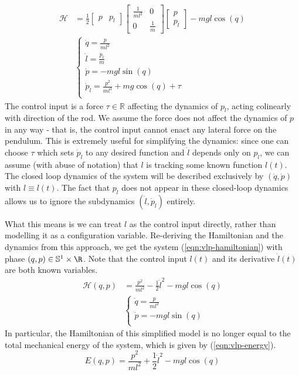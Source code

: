 \begin{align}\label{eqn:vlp-hamiltonian-with-pl}
   \mathcal{H} &= \frac{1}{2} \begin{bmatrix} p & p_l \end{bmatrix}
      \begin{bmatrix}
         \frac{1}{ml^2}  & 0 \\
         0 & \frac{1}{m}
      \end{bmatrix} \begin{bmatrix} p \\ p_l \end{bmatrix} - mgl\cos(q) \\
     &\begin{cases}
        \dot{q} = \frac{p}{ml^2} \\
        \dot{l} = \frac{p_l}{m} \\
        \dot{p} = -mgl\sin(q) \\
        \dot{p}_l = \frac{p^2}{ml^3} + mg\cos(q) + \tau \\
   \end{cases} \nonumber
\end{align}
The control input is a force \(\tau \in \mathbb{R}\) affecting the dynamics of
\(p_l\), acting colinearly with direction of the rod.
We assume the force does not affect the dynamics of \(p\) in any way -
that is, the control input cannot enact any lateral force on the pendulum.
This is extremely useful for simplifying the dynamics: since one can choose
\(\tau\) which sets \(\dot{p}_l\) to any desired function and \(\dot{l}\)
depends only on \(p_l\), we can assume (with abuse of notation) that \(l\) is
tracking some known function \(l(t)\). 
The closed loop dynamics of the system will be described exclusively by
\((\dot{q},\dot{p})\) with \(l \equiv l(t)\).
The fact that \(p_l\) does not appear in these closed-loop dynamics allows us to
ignore the subdynamics \((\dot{l},\dot{p}_l)\) entirely. 

What this means is we can treat \(l\) as the control input directly, rather than
modelling it as a configuration variable. Re-deriving the Hamiltonian and the
dynamics from this approach, we get the system 
(\ref{eqn:vlp-hamiltonian}) with phase \((q,p) \in \mathbb{S}^1 \times \R\). 
Note that the control input \(l(t)\) and its derivative \(\dot{l}(t)\) are both
known variables.
\begin{align}\label{eqn:vlp-hamiltonian}
   \mathcal{H}(q,p) &= \frac{p^2}{ml^2} - \frac{1}{2}\dot{l}^2 - mgl\cos(q) \\
     &\begin{cases}
        \dot{q} = \frac{p}{ml^2} \\
        \dot{p} = -mgl\sin(q) \\
      \end{cases}\nonumber
\end{align}
In particular, the Hamiltonian of this simplified model is no longer equal to
the total mechanical energy of the system, which is given by
(\ref{eqn:vlp-energy}).
\begin{equation}\label{eqn:vlp-energy}
   E(q,p) = \frac{p^2}{ml^2} + \frac{1}{2}\dot{l}^2 - mgl\cos(q)
\end{equation}

